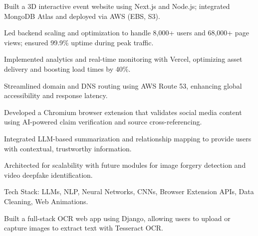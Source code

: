 \documentclass[]{deedy-resume-openfont}
\begin{document}
\begin{minipage}[t]{0.66\textwidth}
\begin{tightemize}
\item Built a 3D interactive event website using Next.js and Node.js; integrated MongoDB Atlas and deployed via AWS (EBS, S3).

\item Led backend scaling and optimization to handle 8,000+ users and 68,000+ page views; ensured 99.9\% uptime during peak traffic.

\item Implemented analytics and real-time monitoring with Vercel, optimizing asset delivery and boosting load times by 40\%.

\item Streamlined domain and DNS routing using AWS Route 53, enhancing global accessibility and response latency.

\end{tightemize}

\sectionsep





\begin{tightemize}

\item Developed a Chromium browser extension that validates social media content using AI-powered claim verification and source cross-referencing.

\item Integrated LLM-based summarization and relationship mapping to provide users with contextual, trustworthy information.

\item Architected for scalability with future modules for image forgery detection and video deepfake identification.

\item Tech Stack: LLMs, NLP, Neural Networks, CNNs, Browser Extension APIs, Data Cleaning, Web Animations.

\end{tightemize}

\sectionsep





\begin{tightemize}

\item Built a full-stack OCR web app using Django, allowing users to upload or capture images to extract text with Tesseract OCR.


\end{tightemize}
\end{minipage}
\end{document}

